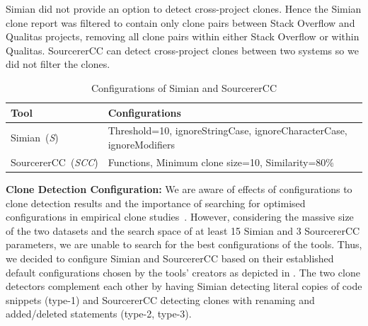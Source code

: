 \documentclass[10pt,journal,compsoc]{IEEEtran}
\begin{document}
Simian did not provide an option to detect cross-project clones. Hence the
Simian clone report was filtered to contain only clone pairs between Stack
Overflow and Qualitas projects, removing all clone pairs within either Stack
Overflow or within Qualitas. 
SourcererCC can detect cross-project clones between two systems so we did
not filter the clones.

\begin{table}
	\centering
	\caption{Configurations of Simian and SourcererCC}
	\label{tab:clone_config}
	\begin{tabular}{lp{5cm}}
		\toprule
		Tool & Configurations \\
		\midrule
		Simian~(\textit{S}) &  Threshold=10, ignoreStringCase, \newline ignoreCharacterCase, \newline ignoreModifiers \\ 
		\midrule
		SourcererCC~(\textit{SCC}) & Functions, Minimum clone size=10, \newline Similarity=80\% \\
		\bottomrule
	\end{tabular}
\end{table}

\textbf{Clone Detection Configuration: } We are aware of effects of
configurations to clone detection results and the importance of searching for
optimised configurations in empirical clone
studies~\cite{Svajlenko2014,Wang2014,cr2016ssbse,Ragkhitwetsagul2016, emse}. However,
considering the massive size of the two datasets and the search space of at
least 15 Simian and 3 SourcererCC parameters, we are unable to search for the
best configurations of the tools. Thus, we decided to configure Simian and
SourcererCC based on their established default configurations chosen by the
tools' creators as depicted in . 
The two clone detectors complement each
other by having Simian detecting literal copies of code snippets (type-1) and SourcererCC
detecting clones with renaming and added/deleted statements (type-2, type-3). 
\end{document}
